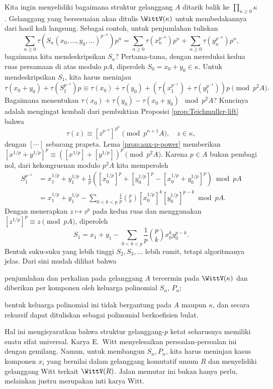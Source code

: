 Kita ingin menyelidiki bagaimana struktur gelanggang $A$ ditarik balik ke $\prod_{n \geq 0} \kappa$. Gelanggang yang bersesuaian akan ditulis $\WittV(\kappa)$ untuk membedakannya dari hasil kali langsung. Sebagai contoh, untuk penjumlahan tuliskan
\[ \sum_{n \geq 0} \tau\left( S_n(x_0, \ldots, y_0, \ldots)^{p^{-n}} \right) p^n = \sum_{n \geq 0} \tau(x_n^{p^{-n}}) p^n + \sum_{n \geq 0} \tau(y_n^{p^{-n}}) p^n, \]
bagaimana kita mendeskripsikan $S_n$? Pertama-tama, dengan mereduksi kedua ruas persamaan di atas modulo $pA$, diperoleh $S_0 = x_0 + y_0 \in \kappa$. Untuk mendeskripsikan $S_1$, kita harus meninjau
\[ \tau(x_0 + y_0) + \tau( S_1^{p^{-1}} )p \equiv \tau(x_0) + \tau(y_0) + \left( \tau(x_1^{p^{-1}}) + \tau(y_1^{p^{-1}}) \right)p \pmod{p^2 A}. \]
Bagaimana menentukan $\tau(x_0) + \tau(y_0) - \tau(x_0+y_0)\; \bmod p^2 A$? Kuncinya adalah mengingat kembali dari pembuktian Proposisi \ref{prop:Teichmuller-lift} bahwa
\begin{equation}\label{eqn:Teich-lifting-power}
	\tau(z) \equiv \left[ z^{p^{-n}} \right]^{p^n} \pmod{ p^{n+1} A}, \quad z \in \kappa,
\end{equation}
dengan $[\cdots]$ sebarang prapeta. Lema \ref{prop:aux-p-power} memberikan $[x^{1/p} + y^{1/p}]^p \equiv \left( [x^{1/p}] + [y^{1/p}] \right)^p \pmod {p^2 A}$. Karena $p \in A$ bukan pembagi nol, dari kekongruenan modulo $p^2 A$ kita memperoleh
\begin{align*}
	S_1^{p^{-1}} & = x_1^{1/p} + y_1^{1/p} + \frac{1}{p} \left( \left[ x_0^{1/p} \right]^p + \left[ y_0^{1/p} \right]^p - \left[ x_0^{1/p} + y_0^{1/p} \right]^p \right) \bmod pA \\
	& = x_1^{1/p} + y_1^{1/p} - \sum_{0 < k < p} \frac{1}{p} \binom{p}{k} \left[ x_0^{1/p} \right]^k \left[ y_0^{1/p} \right]^{p-k} \bmod pA.
\end{align*}
Dengan menerapkan $z \mapsto z^p$ pada kedua ruas dan menggunakan $\left[ z^{1/p} \right]^p \equiv z \pmod {pA}$, diperoleh
\[ S_1 = x_1 + y_1 - \sum_{0 < k < p} \frac{1}{p} \binom{p}{k} x_0^k y_0^{p-k}. \]
Bentuk suku-suku yang lebih tinggi $S_2, S_3, \ldots$ lebih rumit, tetapi algoritmanya jelas. Dari sini mudah dilihat bahwa
\begin{compactitem}
	\item penjumlahan dan perkalian pada gelanggang $A$ tercermin pada $\WittV(\kappa)$ dan diberikan per komponen oleh keluarga polinomial $S_n$, $P_n$;
	\item bentuk keluarga polinomial ini tidak bergantung pada $A$ maupun $\kappa$, dan secara rekursif dapat dituliskan sebagai polinomial berkoefisien bulat.
\end{compactitem}
Hal ini mengisyaratkan bahwa struktur gelanggang-$p$ ketat seharusnya memiliki suatu sifat universal. Karya E.\ Witt \cite{Witt37} menyelesaikan persoalan-persoalan ini dengan gemilang. Namun, untuk membangun $S_n, P_n$, kita harus meninjau kasus komponen $x_i$ yang bernilai dalam gelanggang komutatif umum $R$ dan menyelidiki gelanggang Witt terkait $\WittV(R)$. Jalan memutar ini bukan hanya perlu, melainkan justru merupakan inti karya Witt.

